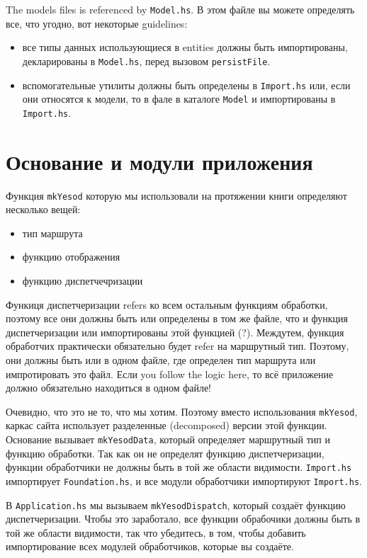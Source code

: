 The models files is referenced by \texttt{Model.hs}. В этом файле вы можете определять все, что угодно,
вот некоторые guidelines:
\begin{itemize}
    \item все типы данных использующиеся в entities должны быть импортированы, декларированы в \texttt{Model.hs}, 
        перед вызовом \lstinline!persistFile!.
    \item вспомогательные утилиты должны быть определены в \texttt{Import.hs} или, если они относятся к модели,
        то в фале в каталоге \texttt{Model} и импортированы в \texttt{Import.hs}.
\end{itemize}

\section{Основание и модули приложения}

Функция \lstinline!mkYesod! которую мы использовали на протяжении книги определяют несколько вещей:

\begin{itemize}
  \item тип маршрута
  \item функцию отображения
  \item функцию диспетчечризации
\end{itemize}

Функиця диспетчеризации refers ко всем остальным функциям обработки, поэтому все они должны быть 
или определены в том же файле, что и функция диспетчеризации или импортированы этой функцией (?). %
Междутем, функция обработчих практически обязательно будет refer на маршрутный тип. Поэтому,
они должны быть или в одном файле, где определен тип маршрута или импротировать это файл.
Если you follow the logic here, то всё приложение должно обязательно находиться в одном файле!

Очевидно, что это не то, что мы хотим. Поэтому вместо использования \lstinline!mkYesod!, каркас 
сайта использует разделенные (decomposed) версии этой функции. Основание вызывает \lstinline!mkYesodData!,
который определяет маршрутный тип и функцию обработки. Так как он не определят функцию диспетчеризации,
функции обработчики не должны быть в той же области видимости. \texttt{Import.hs} импортирует
\texttt{Foundation.hs}, и все модули обработчики импортируют \texttt{Import.hs}.

В \texttt{Application.hs} мы вызываем \lstinline!mkYesodDispatch!, который создаёт функцию диспетчеризации.
Чтобы это заработало, все функции обрабочики должны быть в той же области видимости, так что убедитесь, в 
том, чтобы добавить импортирование всех модулей обработчиков, которые вы создаёте.

